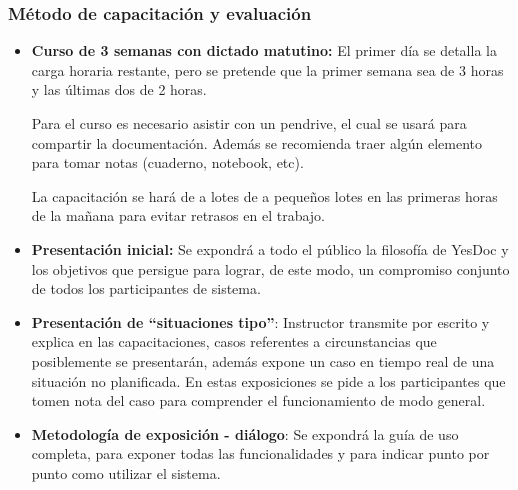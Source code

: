 \documentclass[a4paper,12pt]{article}
\begin{document}
\subsubsection{Método de capacitación y evaluación}
    \begin{itemize}
    	\item \textbf{Curso de 3 semanas con dictado matutino: }El primer día se detalla la carga horaria restante, pero se pretende que la primer semana sea de 3 horas y las últimas dos de 2 horas.
        
Para el curso es necesario asistir con un pendrive, el cual se usará para compartir la documentación. Además se recomienda traer algún elemento para tomar notas (cuaderno, notebook, etc).

La capacitación se hará de a lotes de a pequeños lotes en las primeras horas de la mañana para evitar retrasos en el trabajo.
		\item \textbf{Presentación inicial: } Se expondrá a todo el público la filosofía de YesDoc y los objetivos que persigue para lograr, de este modo, un compromiso conjunto de todos los participantes de sistema.
        
	    \item \textbf{Presentación de “situaciones tipo”}: Instructor transmite por escrito y explica en
las capacitaciones, casos referentes a circunstancias que posiblemente se presentarán, además expone un caso en tiempo real de una situación no planificada. En estas exposiciones se pide a los participantes que tomen nota del caso para comprender el funcionamiento de modo general.

	    \item \textbf{Metodología de exposición - diálogo}: Se expondrá la guía de uso completa, para exponer todas las funcionalidades y para indicar punto por punto como utilizar el sistema.
        




\end{itemize}
\end{document}
